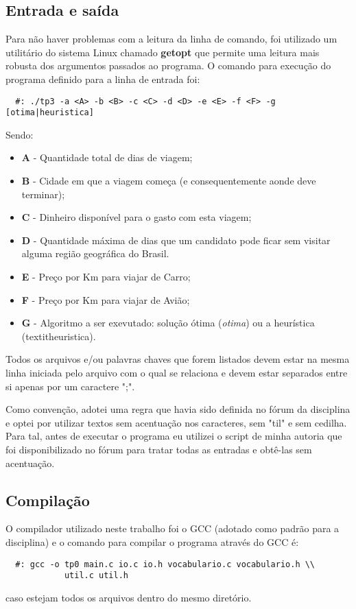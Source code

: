 \documentclass[12pt]{article}
\begin{document}
\subsection{Entrada e saída}
Para não haver problemas com a leitura da linha de comando, foi utilizado um utilitário do
sistema Linux chamado \textbf{getopt} que permite uma leitura mais robusta dos argumentos
passados ao programa. O comando para execução do programa definido para a linha de entrada 
foi:
\begin{verbatim}
  #: ./tp3 -a <A> -b <B> -c <C> -d <D> -e <E> -f <F> -g [otima|heuristica]
\end{verbatim}
Sendo: 
\begin{itemize}
  \item \textbf{A} - Quantidade total de dias de viagem;
  \item \textbf{B} - Cidade em que a viagem começa (e consequentemente aonde deve terminar);
  \item \textbf{C} - Dinheiro disponível para o gasto com esta viagem;
  \item \textbf{D} - Quantidade máxima de dias que um candidato pode ficar sem visitar alguma
  região geográfica do Brasil.
  \item \textbf{E} - Preço por Km para viajar de Carro;
  \item \textbf{F} - Preço por Km para viajar de Avião; 
  \item \textbf{G} - Algoritmo a ser exevutado: solução ótima (\textit{otima}) ou a 
  heurística (textit{heuristica}).
\end{itemize}

Todos os arquivos e/ou palavras chaves que forem listados devem estar na mesma linha 
iniciada pelo arquivo com o qual se relaciona e devem estar separados entre si apenas por
um caractere ";".

Como convenção, adotei uma regra que havia sido definida no fórum da disciplina e optei 
por utilizar textos sem acentuação nos caracteres, sem "til" e sem cedilha. Para tal, 
antes de executar o programa eu utilizei o script de minha autoria que foi disponibilizado
no fórum para tratar todas as entradas e obtê-las sem acentuação.

\subsection{Compilação}
O compilador utilizado neste trabalho foi o GCC (adotado como padrão para a disciplina) e 
o comando para compilar o programa através do GCC é:
\begin{verbatim}
  #: gcc -o tp0 main.c io.c io.h vocabulario.c vocabulario.h \\
            util.c util.h
\end{verbatim}
caso estejam todos os arquivos dentro do mesmo diretório.
\end{document}
